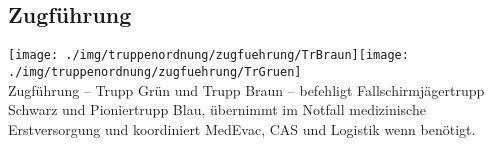 \subsection{Zugführung}
\texttt{[image: ./img/truppenordnung/zugfuehrung/TrBraun]}\quad\texttt{[image: ./img/truppenordnung/zugfuehrung/TrGruen]}\\
Zugführung -- Trupp Grün und Trupp Braun -- befehligt Fallschirmjägertrupp Schwarz und Pioniertrupp Blau, übernimmt im Notfall medizinische Erstversorgung und koordiniert \ac{MedEvac}, \ac{CAS} und Logistik wenn benötigt. 